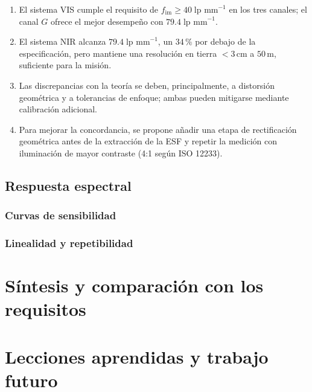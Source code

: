     \begin{enumerate}
        \item El sistema VIS cumple el requisito de \(f_{\text{im}}\ge40\;\text{lp mm}^{-1}\)  
              en los tres canales; el canal \(G\) ofrece el mejor desempeño
              con \(79.4\;\text{lp mm}^{-1}\).
        \item El sistema NIR alcanza \(79.4\;\text{lp mm}^{-1}\), un \(34\,\%\)
              por debajo de la especificación, pero mantiene una
              resolución en tierra \(<3\,\text{cm}\) a \(50\,\text{m}\),
              suficiente para la misión.
        \item Las discrepancias con la teoría se deben, principalmente,
              a distorsión geométrica y a tolerancias de enfoque; ambas
              pueden mitigarse mediante calibración adicional.
        \item Para mejorar la concordancia,
              se propone añadir una etapa de rectificación geométrica
              antes de la extracción de la ESF y repetir la medición
              con iluminación de mayor contraste (4:1 según ISO 12233).
      \end{enumerate}


  \subsection{Respuesta espectral}
    \subsubsection{Curvas de sensibilidad}
    \subsubsection{Linealidad y repetibilidad}

\section{Síntesis y comparación con los requisitos}

\section{Lecciones aprendidas y trabajo futuro}

